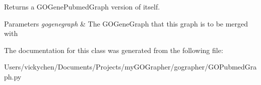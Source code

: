 Returns a GOGenePubmedGraph version of itself. 


\begin{DoxyParams}{Parameters}
{\em gogenegraph} & The GOGeneGraph that this graph is to be merged with \\
\hline
\end{DoxyParams}


The documentation for this class was generated from the following file:\begin{DoxyCompactItemize}
\item 
Users/vickychen/Documents/Projects/myGOGrapher/gographer/GOPubmedGraph.py\end{DoxyCompactItemize}
